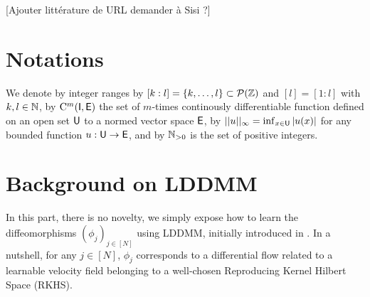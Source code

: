[Ajouter littérature de URL demander à Sisi ?]
\section{Notations}
We denote by integer ranges by $[k:l]=\{k,\ldots,l\}\subset \mathcal{P}(\mathbb{Z})$ and $ [l]=[1:l]$ with $k,l\in \mathbb{N}$,
by $\mathrm{C}^m(\mathsf{I},\mathsf{E})$ the set of $m$-times continously differentiable function defined on an open set $\mathsf{U}$ to a normed vector space $\mathsf{E}$,
 by $||u||_\infty=\inf_{x\in \mathsf{U}} |u(x)| $ for any bounded function $u:\mathsf{U} \to \mathsf{E}$,
and by $\mathbb{N}_{>0}$ is the set of positive integers. 

\section{Background on LDDMM}
\label{section:LDDMM}

In this part, there is no novelty, we simply expose how to
 learn the diffeomorphisms $(\phi_j)_{j\in[N]}$ using LDDMM, initially introduced in \cite{beg2005computing}.
  In a nutshell, for any $j\in [N]$, $\phi_j$ corresponds to a differential flow related to a learnable velocity field belonging to a well-chosen Reproducing Kernel Hilbert Space (RKHS).


